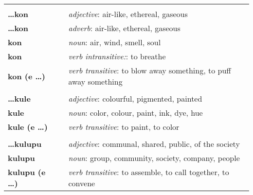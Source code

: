 \begin{supertabular}{p{2,5cm}|ll}
                                 &  &                                                                                                            \\ %
    \textbf{\dots kon}           &  & \textit{adjective}: air-like, ethereal, gaseous                                                            \\
    \textbf{\dots kon}           &  & \textit{adverb}: air-like, ethereal, gaseous                                                               \\
    \textbf{kon}                 &  & \textit{noun}: air, wind, smell, soul                                                                      \\
    \textbf{kon}                 &  & \textit{verb intransitive:}: to breathe                                                                    \\
    \textbf{kon (e \dots)}       &  & \textit{verb transitive}: to blow away something, to puff away something                                   \\
                                 &  &                                                                                                            \\ %
    \textbf{\dots kule}          &  & \textit{adjective}: colourful, pigmented, painted                                                          \\
    \textbf{kule}                &  & \textit{noun}: color, colour, paint, ink, dye, hue                                                         \\
    \textbf{kule (e \dots)}      &  & \textit{verb transitive}: to paint, to color                                                               \\
                                 &  &                                                                                                            \\ %
    \textbf{\dots kulupu}        &  & \textit{adjective}: communal, shared, public, of the society                                               \\
    \textbf{kulupu}              &  & \textit{noun}: group, community, society, company, people                                                  \\
    \textbf{kulupu (e \dots)}    &  & \textit{verb transitive}: to assemble, to call together, to convene                                        \\

\end{supertabular}
